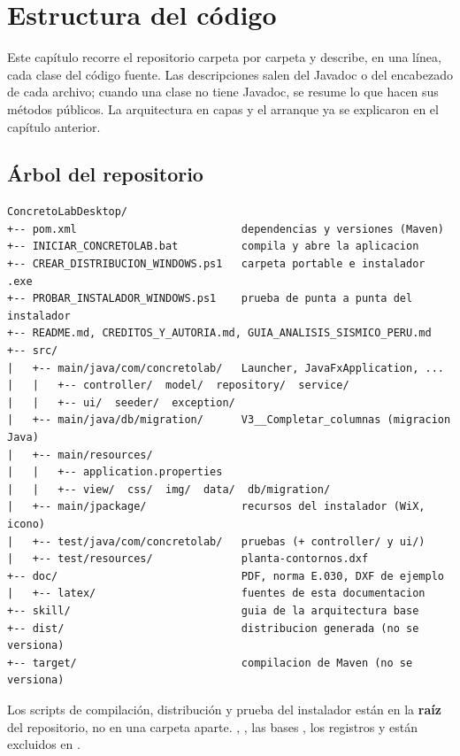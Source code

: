 \section{Estructura del código}
\label{sec:est-estructura}

Este capítulo recorre el repositorio carpeta por carpeta y describe, en una línea, cada clase del código fuente. Las
descripciones salen del Javadoc o del encabezado de cada archivo; cuando una clase no tiene Javadoc, se resume lo que
hacen sus métodos públicos. La arquitectura en capas y el arranque ya se explicaron en el capítulo anterior.

\subsection{Árbol del repositorio}

\begin{verbatim}
ConcretoLabDesktop/
+-- pom.xml                          dependencias y versiones (Maven)
+-- INICIAR_CONCRETOLAB.bat          compila y abre la aplicacion
+-- CREAR_DISTRIBUCION_WINDOWS.ps1   carpeta portable e instalador .exe
+-- PROBAR_INSTALADOR_WINDOWS.ps1    prueba de punta a punta del instalador
+-- README.md, CREDITOS_Y_AUTORIA.md, GUIA_ANALISIS_SISMICO_PERU.md
+-- src/
|   +-- main/java/com/concretolab/   Launcher, JavaFxApplication, ...
|   |   +-- controller/  model/  repository/  service/
|   |   +-- ui/  seeder/  exception/
|   +-- main/java/db/migration/      V3__Completar_columnas (migracion Java)
|   +-- main/resources/
|   |   +-- application.properties
|   |   +-- view/  css/  img/  data/  db/migration/
|   +-- main/jpackage/               recursos del instalador (WiX, icono)
|   +-- test/java/com/concretolab/   pruebas (+ controller/ y ui/)
|   +-- test/resources/              planta-contornos.dxf
+-- doc/                             PDF, norma E.030, DXF de ejemplo
|   +-- latex/                       fuentes de esta documentacion
+-- skill/                           guia de la arquitectura base
+-- dist/                            distribucion generada (no se versiona)
+-- target/                          compilacion de Maven (no se versiona)
\end{verbatim}

\begin{nota}
Los scripts de compilación, distribución y prueba del instalador están en la \textbf{raíz} del repositorio, no en una
carpeta aparte. , , las bases , los registros  y
 están excluidos en .
\end{nota}

